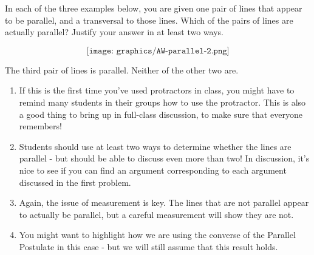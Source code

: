 \documentclass{ximera}
\begin{document}
\newpage
\begin{problem}

In each of the three examples below, you are given one pair of lines that appear to be parallel, and a transversal to those lines.  Which of the pairs of lines are actually parallel?  Justify your answer in at least two ways.

\[
\texttt{[image: graphics/AW-parallel-2.png]}
\]

\begin{solution}
    The third pair of lines is parallel.  Neither of the other two are.
\end{solution}

\begin{instructorNotes}
\begin{enumerate}
\item If this is the first time you've used protractors in class, you might have to remind many students in their groups how to use the protractor.  This is also a good thing to bring up in full-class discussion, to make sure that everyone remembers!
\item Students should use at least two ways to determine whether the lines are parallel - but should be able to discuss even more than two!  In discussion, it's nice to see if you can find an argument corresponding to each argument discussed in the first problem.  
\item Again, the issue of measurement is key.  The lines that are not parallel appear to actually be parallel, but a careful measurement will show they are not.
\item You might want to highlight how we are using the converse of the Parallel Postulate in this case - but we will still assume that this result holds.
\end{enumerate}
\end{instructorNotes}
\end{problem}
\end{document}
